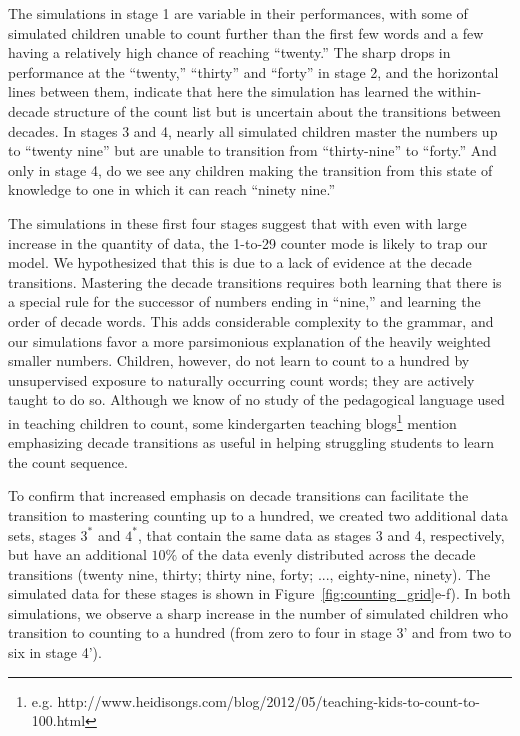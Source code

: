 \documentclass[10pt,letterpaper]{article}
\begin{document}
The simulations in stage 1 are variable in their performances, with
some of simulated children unable to count further than the first few
words and a few having a relatively high chance of reaching
``twenty.'' The sharp drops in performance at the ``twenty,'' ``thirty''
and ``forty'' in stage 2, and the horizontal lines between them,
indicate that here the simulation has learned the within-decade
structure of the count list but is uncertain about the transitions
between decades. In stages 3 and 4, nearly all simulated children
master the numbers up to ``twenty nine'' but are unable to transition from
``thirty-nine'' to ``forty.'' And only in stage 4, do we see any
children making the transition from this state of knowledge to one in
which it can reach ``ninety nine.'' 

The simulations in these first four stages suggest that with even with
large increase in the quantity of data, the 1-to-29 counter mode is
likely to trap our model. We hypothesized that this is due to a lack
of evidence at the decade transitions. Mastering the decade
transitions requires both learning that there is a special rule for
the successor of numbers ending in ``nine,'' and learning the order of
decade words. This adds considerable complexity to the grammar, and
our simulations favor a more parsimonious explanation of the heavily
weighted smaller numbers. Children, however, do not learn to count to
a hundred by unsupervised exposure to naturally occurring count words;
they are actively taught to do so. Although we know of no study of the
pedagogical language used in teaching children to count, some kindergarten teaching
blogs\footnote{e.g. http://www.heidisongs.com/blog/2012/05/teaching-kids-to-count-to-100.html}
mention emphasizing decade transitions as useful in helping struggling
students to learn the count sequence.

To confirm that increased emphasis on decade transitions can
facilitate the transition to mastering counting up to a hundred, we
created two additional data sets, stages $3^*$ and $4^*$, that contain the
same data as stages 3 and 4, respectively, but have an additional
$10\%$ of the data evenly distributed across the decade transitions
(twenty nine, thirty; thirty nine, forty; ..., eighty-nine,
ninety). The simulated data for these stages is shown in
Figure~\ref{fig:counting_grid}e-f). In both simulations, we observe a
sharp increase in the number of simulated children who transition to
counting to a hundred (from zero to four in stage 3' and from two to
six in stage 4').
\end{document}
